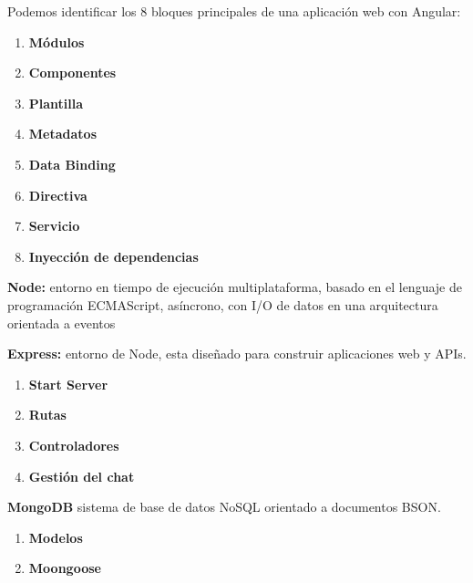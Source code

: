 \documentclass[notes,slidesec,a4]{seminar}
\begin{document}
\begin{hslide}
Podemos identificar los 8 bloques principales de una aplicación web con Angular:
\begin{enumerate}
\item \textbf {Módulos}
\item \textbf {Componentes}
\item \textbf {Plantilla}
\item \textbf {Metadatos}
\item \textbf {Data Binding}
\item \textbf {Directiva}
\item \textbf {Servicio}
\item \textbf {Inyección de dependencias}
\end{enumerate}
\end{hslide}



\begin{hslide}
\textbf {Node: }entorno en tiempo de ejecución multiplataforma, basado en el lenguaje de programación ECMAScript, asíncrono, con I/O de datos en una arquitectura orientada a eventos

\textbf {Express: }entorno de Node, esta diseñado para construir aplicaciones web y APIs.
\begin{enumerate}
\item \textbf {Start Server}
\item \textbf {Rutas}
\item \textbf {Controladores}
\item \textbf {Gestión del chat}
\end{enumerate}
\end{hslide}


\begin{hslide}
\textbf{MongoDB} sistema de base de datos NoSQL orientado a documentos BSON.
\begin{enumerate}
\item \textbf {Modelos}
\item \textbf {Moongoose}
\end{enumerate}
\end{hslide}
\end{document}

